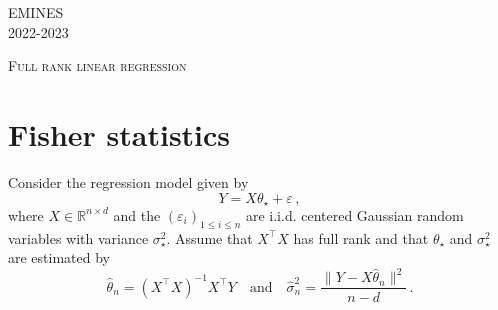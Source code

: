 \documentclass[a4paper,10pt,fleqn]{article}
\newcommand{\eqsp}{\,}
\newcommand{\rset}{\ensuremath{\mathbb{R}}}
\newcommand{\1}{\ensuremath{\mathbbm{1}}}
\newcommand{\param}{\theta}
\begin{document}
\noindent EMINES \hfill \\%
 2022-2023

\noindent\hrulefill

\begin{center}
\textsc{Full rank linear regression}
\end{center}
\hrulefill

\medskip


\section{Fisher statistics}
Consider the regression model given by
$$
Y = X\param_{\star}+ \varepsilon\eqsp,
$$
where $X\in\rset^{n\times d}$ and the $(\varepsilon_{i})_{1\leqslant i \leqslant n}$ are i.i.d. centered Gaussian random variables with variance $\sigma_{\star}^2$. Assume that $X^\top X$ has full rank and that $\param_\star$ and $\sigma_{\star}^2$ are estimated by 
$$
\widehat \param_n = (X^\top X)^{-1}X^\top Y\quad\mathrm{and}\quad \widehat \sigma^2_n =\frac{\|Y - X\widehat \param_n \|^2}{n-d}\eqsp.
$$
\end{document}
